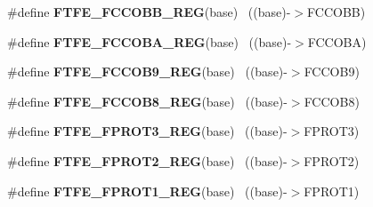 \begin{DoxyCompactItemize}
\item 
\hypertarget{group___f_t_f_e___register___accessor___macros_ga0b53c815c5623601f405594e8ea8c1f3}{}\#define {\bfseries F\+T\+F\+E\+\_\+\+F\+C\+C\+O\+B\+B\+\_\+\+R\+E\+G}(base)                                    ~((base)-\/$>$F\+C\+C\+O\+B\+B)\label{group___f_t_f_e___register___accessor___macros_ga0b53c815c5623601f405594e8ea8c1f3}

\item 
\hypertarget{group___f_t_f_e___register___accessor___macros_gaa6dca533231f6157fbf7eaef42ce283a}{}\#define {\bfseries F\+T\+F\+E\+\_\+\+F\+C\+C\+O\+B\+A\+\_\+\+R\+E\+G}(base)                                    ~((base)-\/$>$F\+C\+C\+O\+B\+A)\label{group___f_t_f_e___register___accessor___macros_gaa6dca533231f6157fbf7eaef42ce283a}

\item 
\hypertarget{group___f_t_f_e___register___accessor___macros_ga5c14b90518da27748aa06a69c1010a83}{}\#define {\bfseries F\+T\+F\+E\+\_\+\+F\+C\+C\+O\+B9\+\_\+\+R\+E\+G}(base)                                    ~((base)-\/$>$F\+C\+C\+O\+B9)\label{group___f_t_f_e___register___accessor___macros_ga5c14b90518da27748aa06a69c1010a83}

\item 
\hypertarget{group___f_t_f_e___register___accessor___macros_gac841a328d6abf2a5a692aa385360aaae}{}\#define {\bfseries F\+T\+F\+E\+\_\+\+F\+C\+C\+O\+B8\+\_\+\+R\+E\+G}(base)                                    ~((base)-\/$>$F\+C\+C\+O\+B8)\label{group___f_t_f_e___register___accessor___macros_gac841a328d6abf2a5a692aa385360aaae}

\item 
\hypertarget{group___f_t_f_e___register___accessor___macros_gab0875fae99b2f51db40809fabf94edcf}{}\#define {\bfseries F\+T\+F\+E\+\_\+\+F\+P\+R\+O\+T3\+\_\+\+R\+E\+G}(base)                                    ~((base)-\/$>$F\+P\+R\+O\+T3)\label{group___f_t_f_e___register___accessor___macros_gab0875fae99b2f51db40809fabf94edcf}

\item 
\hypertarget{group___f_t_f_e___register___accessor___macros_ga932fbe26c0fe7eda4bea84dcd666e357}{}\#define {\bfseries F\+T\+F\+E\+\_\+\+F\+P\+R\+O\+T2\+\_\+\+R\+E\+G}(base)                                    ~((base)-\/$>$F\+P\+R\+O\+T2)\label{group___f_t_f_e___register___accessor___macros_ga932fbe26c0fe7eda4bea84dcd666e357}

\item 
\hypertarget{group___f_t_f_e___register___accessor___macros_ga1c4589291fd385d6f9420c040f95a224}{}\#define {\bfseries F\+T\+F\+E\+\_\+\+F\+P\+R\+O\+T1\+\_\+\+R\+E\+G}(base)                                    ~((base)-\/$>$F\+P\+R\+O\+T1)\label{group___f_t_f_e___register___accessor___macros_ga1c4589291fd385d6f9420c040f95a224}


\end{DoxyCompactItemize}
